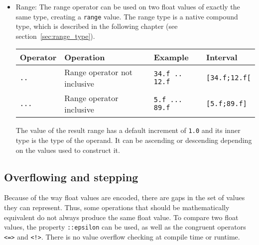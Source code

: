 \begin{itemize}
  \begin{lstlisting}[style=coloredverbatim]
let mut a = 11.0;
let b = a * 12.0 + 3.0;
a *= 12.0 + 3.0;

assert (b == 135.0);
assert (a == 165.0);
  \end{lstlisting}

\item Range: The range operator can be used on two float values of exactly the
  same type, creating a \texttt{range} value. The range type is a native
  compound type, which is described in the following chapter (see
  section~\ref{sec:range_type}).

  \begin{center}
    \vspace{-20pt}
    \begin{adjustbox}{max width=1.0\linewidth}
      \begin{tabular}{|l|lll|}
        \hline
        Operator & Operation & Example & Interval\\[0pt]
        \hline
        \hline
        \texttt{..} & Range operator not inclusive & \texttt{34.f .. 12.f} & \texttt{[34.f;12.f[}\\[0pt]
            \texttt{...} & Range operator inclusive & \texttt{5.f ... 89.f} & \texttt{[5.f;89.f]}\\[0pt]
            \hline
      \end{tabular}
    \end{adjustbox}
  \end{center}


  The value of the result range has a default increment of \texttt{1.0} and its
  inner type is the type of the operand. It can be ascending or descending
  depending on the values used to construct it.

\end{itemize}

\subsection{Overflowing and stepping}
\label{sec:orgd5d9f51}

Because of the way float values are encoded, there are gaps in the set of values
they can represent. Thus, some operations that should be mathematically
equivalent do not always produce the same float value. To compare two float
values, the property \texttt{::epsilon} can be used, as well as the congruent
operators \texttt{<=>} and \texttt{<!>}. There is no value overflow checking
at compile time or runtime.

